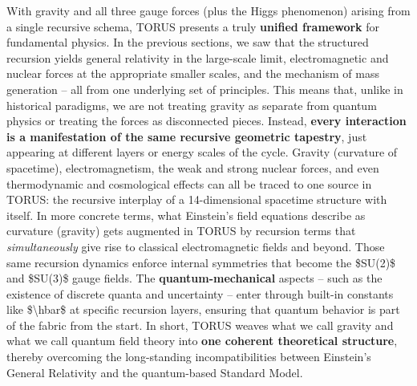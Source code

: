 \documentclass[]{article}
\begin{document}
With gravity and all three gauge forces (plus the Higgs phenomenon)
arising from a single recursive schema, TORUS presents a truly
\textbf{unified framework} for fundamental physics. In the previous
sections, we saw that the structured recursion yields general relativity
in the large-scale limit, electromagnetic and nuclear forces at the
appropriate smaller scales, and the mechanism of mass generation -- all
from one underlying set of principles​. This means that, unlike in
historical paradigms, we are not treating gravity as separate from
quantum physics or treating the forces as disconnected pieces. Instead,
\textbf{every interaction is a manifestation of the same recursive
geometric tapestry}, just appearing at different layers or energy scales
of the cycle​. Gravity (curvature of spacetime), electromagnetism, the
weak and strong nuclear forces, and even thermodynamic and cosmological
effects can all be traced to one source in TORUS: the recursive
interplay of a 14-dimensional spacetime structure with itself. In more
concrete terms, what Einstein's field equations describe as curvature
(gravity) gets augmented in TORUS by recursion terms that
\emph{simultaneously} give rise to classical electromagnetic fields and
beyond​. Those same recursion dynamics enforce internal symmetries that
become the \$SU(2)\$ and \$SU(3)\$ gauge fields. The
\textbf{quantum-mechanical} aspects -- such as the existence of discrete
quanta and uncertainty -- enter through built-in constants like
\$\textbackslash{}hbar\$ at specific recursion layers, ensuring that
quantum behavior is part of the fabric from the start​. In short, TORUS
weaves what we call gravity and what we call quantum field theory into
\textbf{one coherent theoretical structure}, thereby overcoming the
long-standing incompatibilities between Einstein's General Relativity
and the quantum-based Standard Model.
\end{document}
